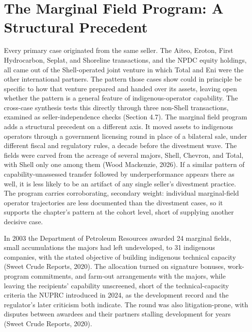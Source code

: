 \documentclass[twoside,fontset=lmodern]{mitthesis}
\begin{document}
\hypertarget{the-marginal-field-program-a-structural-precedent}{%
\section{The Marginal Field Program: A Structural
Precedent}\label{the-marginal-field-program-a-structural-precedent}}

Every primary case originated from the same seller. The Aiteo, Eroton,
First Hydrocarbon, Seplat, and Shoreline transactions, and the NPDC
equity holdings, all came out of the Shell-operated joint venture in
which Total and Eni were the other international partners. The pattern
those cases show could in principle be specific to how that venture
prepared and handed over its assets, leaving open whether the pattern is
a general feature of indigenous-operator capability. The cross-case
synthesis tests this directly through three non-Shell transactions,
examined as seller-independence checks (Section 4.7). The marginal field
program adds a structural precedent on a different axis. It moved assets
to indigenous operators through a government licensing round in place of
a bilateral sale, under different fiscal and regulatory rules, a decade
before the divestment wave. The fields were carved from the acreage of
several majors, Shell, Chevron, and Total, with Shell only one among
them (Wood Mackenzie, 2026). If a similar pattern of
capability-unassessed transfer followed by underperformance appears
there as well, it is less likely to be an artifact of any single
seller's divestment practice. The program carries corroborating,
secondary weight: individual marginal-field operator trajectories are
less documented than the divestment cases, so it supports the chapter's
pattern at the cohort level, short of supplying another decisive case.

In 2003 the Department of Petroleum Resources awarded 24 marginal
fields, small accumulations the majors had left undeveloped, to 31
indigenous companies, with the stated objective of building indigenous
technical capacity (Sweet Crude Reports, 2020). The allocation turned on
signature bonuses, work-program commitments, and farm-out arrangements
with the majors, while leaving the recipients' capability unscreened,
short of the technical-capacity criteria the NUPRC introduced in 2024,
as the development record and the regulator's later criticism both
indicate. The round was also litigation-prone, with disputes between
awardees and their partners stalling development for years (Sweet Crude
Reports, 2020).
\end{document}
